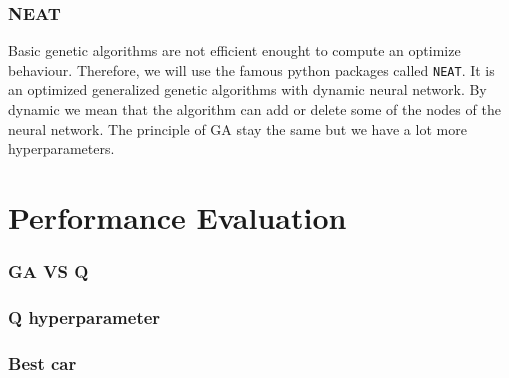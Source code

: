 \documentclass[11pt,a4paper]{article}
\begin{document}
		\section{NEAT}
Basic genetic algorithms are not efficient enought to compute an optimize behaviour. Therefore, we will use the famous python packages called \texttt{NEAT}. It is an optimized generalized genetic algorithms with dynamic neural network. By dynamic we mean that the algorithm can add or delete some of the nodes of the neural network. The principle of GA stay the same but we have a lot more hyperparameters.
	
	
	\part{Performance Evaluation}
		\section{GA VS Q}
		
		\section{Q hyperparameter}
		
		\section{Best car}
\end{document}
